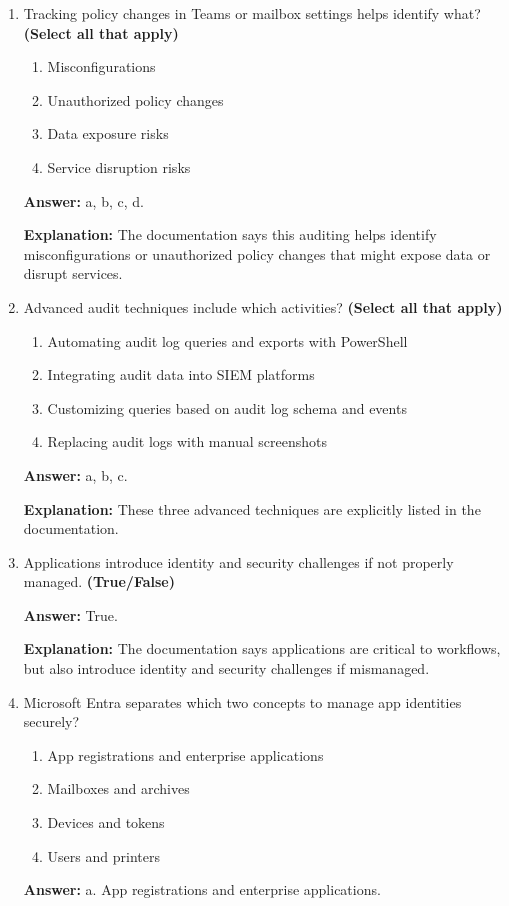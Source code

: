 \documentclass[10pt]{article}
\begin{document}
\begin{enumerate}[leftmargin=*]
\item Tracking policy changes in Teams or mailbox settings helps identify what? \textbf{(Select all that apply)}
\begin{enumerate}[label=\alph*., leftmargin=1.5em]
\item Misconfigurations
\item Unauthorized policy changes
\item Data exposure risks
\item Service disruption risks
\end{enumerate}
\textbf{Answer:} a, b, c, d.

\textbf{Explanation:} The documentation says this auditing helps identify misconfigurations or unauthorized policy changes that might expose data or disrupt services.

\item Advanced audit techniques include which activities? \textbf{(Select all that apply)}
\begin{enumerate}[label=\alph*., leftmargin=1.5em]
\item Automating audit log queries and exports with PowerShell
\item Integrating audit data into SIEM platforms
\item Customizing queries based on audit log schema and events
\item Replacing audit logs with manual screenshots
\end{enumerate}
\textbf{Answer:} a, b, c.

\textbf{Explanation:} These three advanced techniques are explicitly listed in the documentation.

\item Applications introduce identity and security challenges if not properly managed. \textbf{(True/False)}

\textbf{Answer:} True.

\textbf{Explanation:} The documentation says applications are critical to workflows, but also introduce identity and security challenges if mismanaged.

\item Microsoft Entra separates which two concepts to manage app identities securely?
\begin{enumerate}[label=\alph*., leftmargin=1.5em]
\item App registrations and enterprise applications
\item Mailboxes and archives
\item Devices and tokens
\item Users and printers
\end{enumerate}
\textbf{Answer:} a. App registrations and enterprise applications.


\end{enumerate}
\end{document}
